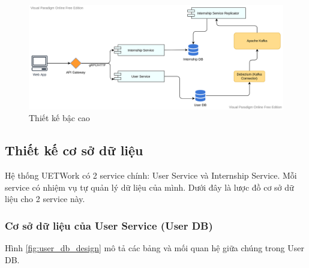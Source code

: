 \documentclass[./../main.tex]{subfiles}
\begin{document}
\begin{figure}
	\includegraphics[width=\linewidth]{./images/image6.png}
	\caption{Thiết kế bậc cao}
	\label{fig:high_level_design}
\end{figure}

\subsection{Thiết kế cơ sở dữ liệu}

Hệ thống UETWork có 2 service chính: User Service và Internship Service. Mỗi service có nhiệm vụ tự quản lý dữ liệu của mình. Dưới đây là lược đồ cơ sở dữ liệu cho 2 service này.

\subsubsection{Cơ sở dữ liệu của User Service (User DB)}

Hình \ref{fig:user_db_design} mô tả các bảng và mối quan hệ giữa chúng trong User DB.
\end{document}
